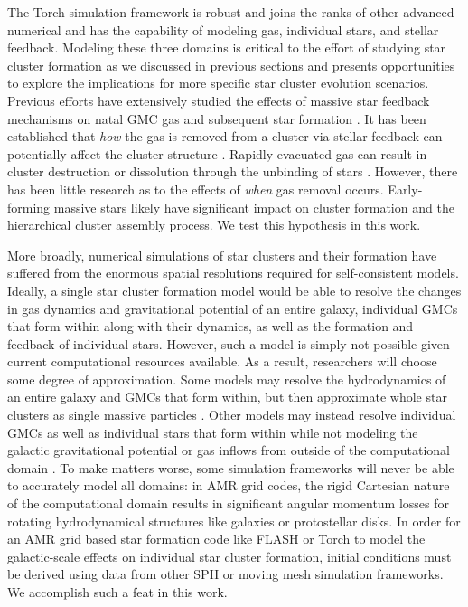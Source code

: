 \documentclass[twoside]{drexel-thesis}
\begin{document}
\begin{thesis}
The Torch simulation framework is robust and joins the ranks of other advanced numerical and has the capability of modeling gas, individual stars, and stellar feedback. Modeling these three domains is critical to the effort of studying star cluster formation as we discussed in previous sections and presents opportunities to explore the implications for more specific star cluster evolution scenarios. Previous efforts have extensively studied the effects of massive star feedback mechanisms on natal GMC gas and subsequent star formation \citep{dale_ionizing_2012,dale_before_2014}. It has been established that \emph{how} the gas is removed from a cluster via stellar feedback can potentially affect the cluster structure \citep{smith_infant_2013}. Rapidly evacuated gas can result in cluster destruction or dissolution through the unbinding of stars \citep{lada_embedded_2003,portegies_zwart_young_2010, banerjee_how_2017}.  However, there has been little research as to the effects of \emph{when} gas removal occurs. Early-forming massive stars likely have significant impact on cluster formation and the hierarchical cluster assembly process. We test this hypothesis in this work.

More broadly, numerical simulations of star clusters and their formation have suffered from the enormous spatial resolutions required for self-consistent models. Ideally, a single star cluster formation model would be able to resolve the changes in gas dynamics and gravitational potential of an entire galaxy, individual GMCs that form within along with their dynamics, as well as the formation and feedback of individual stars. However, such a model is simply not possible given current computational resources available. As a result, researchers will choose some degree of approximation. Some models may resolve the hydrodynamics of an entire galaxy and GMCs that form within, but then approximate whole star clusters as single massive particles \citep{li_effects_2020}. Other models may instead resolve individual GMCs as well as individual stars that form within while not modeling the galactic gravitational potential or gas inflows from outside of the computational domain \citep{grudic_starforge_2021}. To make matters worse, some simulation frameworks will never be able to accurately model all domains: in AMR grid codes, the rigid Cartesian nature of the computational domain results in significant angular momentum losses for rotating hydrodynamical structures like galaxies or protostellar disks. In order for an AMR grid based star formation code like FLASH or Torch to model the galactic-scale effects on individual star cluster formation, initial conditions must be derived using data from other SPH or moving mesh simulation frameworks. We accomplish such a feat in this work.


\end{thesis}
\end{document}

